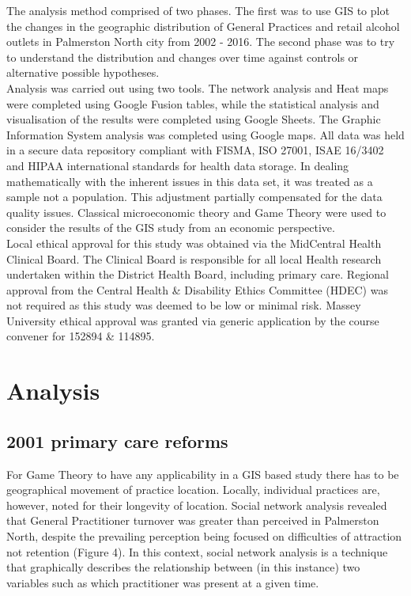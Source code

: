 \documentclass[11pt,a4paper]{article}
\begin{document}
The analysis method comprised of two phases. The first was to use GIS to plot the changes in the geographic distribution of General Practices and retail alcohol outlets in Palmerston North city from 2002 - 2016. The second phase was to try to understand the distribution and changes over time against controls or alternative possible hypotheses. \\


Analysis was carried out using two tools. The network analysis and Heat maps were completed using Google Fusion tables, while the statistical analysis and visualisation of the results were completed using Google Sheets. The Graphic Information System analysis was completed using Google maps. All data was held in a secure data repository compliant with FISMA, ISO 27001, ISAE 16/3402 and HIPAA international standards for health data storage. In dealing mathematically with the inherent issues in this data set, it was treated as a sample not a population. This adjustment partially compensated for the data quality issues. Classical microeconomic theory and Game Theory were used to consider the results of the GIS study from an economic perspective. \\


Local ethical approval for this study was obtained via the MidCentral Health Clinical Board. The Clinical Board is responsible for all local Health research undertaken within the District Health Board, including primary care.  Regional approval from the Central Health \& Disability Ethics Committee (HDEC) was not required as this study was deemed to be  low or minimal risk. Massey University ethical approval was granted via generic application by the course convener for 152894 \& 114895. \\


\section{Analysis}
\subsection{2001 primary care reforms}
For Game Theory to have any applicability in a GIS based study there has to be geographical movement of practice location. Locally, individual practices are, however,  noted for their longevity of location. Social network analysis revealed that General Practitioner turnover was greater than perceived in Palmerston North, despite the prevailing perception being focused on difficulties of attraction not retention (Figure 4). In this context, social network analysis is a technique that graphically describes the relationship between (in this instance) two variables such as which practitioner was present at a given time.\\
\end{document}
